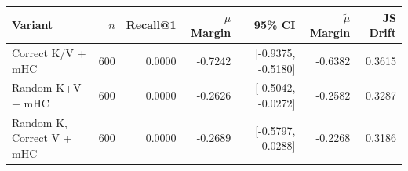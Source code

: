 \begin{tabular}{l r r r r r r}
\toprule
Variant & $n$ & Recall@1 & $\mu$ Margin & 95\% CI & $\tilde{\mu}$ Margin & JS Drift \\
\midrule
Correct K/V + mHC & 600 & 0.0000 & -0.7242 & [-0.9375, -0.5180] & -0.6382 & 0.3615 \\
Random K+V + mHC & 600 & 0.0000 & -0.2626 & [-0.5042, -0.0272] & -0.2582 & 0.3287 \\
Random K, Correct V + mHC & 600 & 0.0000 & -0.2689 & [-0.5797, 0.0288] & -0.2268 & 0.3186 \\
\bottomrule
\end{tabular}
